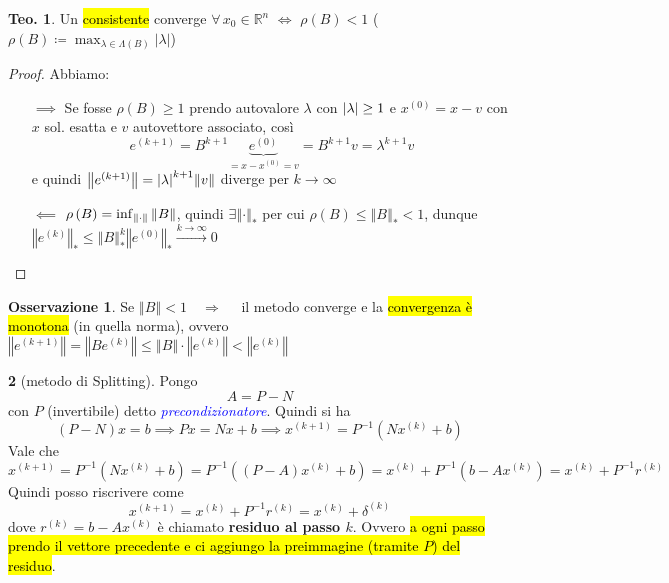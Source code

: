 \documentclass[a4paper,10pt]{article}
\theoremstyle{definition}
\theoremstyle{indentdefinition}
\theoremstyle{indenttheorem}
\newtheorem{thm}{Teo.}
\theoremstyle{myremark}
\newtheorem*{rem*}{Osservazione}
\theoremstyle{indentgeneral}
\newtheorem{lyxalgorithm}[thm]{\protect\algorithmname}
\theoremstyle{plain}
\theoremstyle{plain}
\newenvironment{myboxed} 
{\noindent\begin{lrbox}{\mybox}\begin{minipage}{\textwidth}}
{\end{minipage}\end{lrbox}\fbox{\usebox{\mybox}}}
\begin{document}
\begin{myboxed}
\begin{thm}
Un  \hl{consistente} converge
$\forall\,x_{0}\in\mathbb{R}^{n}$ $\Longleftrightarrow$ $\rho\left(B\right)<1$
($\rho\left(B\right)\coloneqq\max_{\lambda\in\Lambda\left(B\right)}\left|\lambda\right|$)
\end{thm}
\end{myboxed}

\begin{proof}
Abbiamo:
\begin{itemize}
    \item[$\implies$] Se fosse $\rho(B)\ge1$ prendo autovalore $\lambda$ con $\abs{\lambda}\ge 1$ e $x^{(0)}=x-v$ con $x$ sol. esatta e $v$ autovettore associato, così
    $$e^{(k+1)}=B^{k+1}\underbrace{e^{(0)}}_{=x-x^{(0)}=v}=B^{k+1}v=\lambda^{k+1}v$$
    e quindi $\norm{e^{(k+1)}}=\abs{\lambda}^{k+1}\norm{v}$ diverge per $k\to\infty$
    \item[$\impliedby$] $\rho\left(B\right)=\inf_{ \norm{\cdot}}\left\Vert B\right\Vert $,
quindi $\exists\left\Vert \cdot\right\Vert _{*}$ per cui $\rho\left(B\right)\leq\left\Vert B\right\Vert _{*}<1$,
dunque $\left\Vert e^{\left(k\right)}\right\Vert _{*}\leq\left\Vert B\right\Vert^k_{*}\left\Vert e^{\left(0\right)}\right\Vert _{*}\overset{k\to\infty}{\to}0$
\end{itemize}

\end{proof}
\begin{rem*}
Se $\left\Vert B\right\Vert <1\quad\Longrightarrow\quad$ 
il metodo converge e la \hl{convergenza è monotona} (in quella norma), ovvero $\left\Vert e^{\left(k+1\right)}\right\Vert =\left\Vert Be^{\left(k\right)}\right\Vert \leq\left\Vert B\right\Vert \cdot\left\Vert e^{\left(k\right)}\right\Vert <\left\Vert e^{\left(k\right)}\right\Vert $
\end{rem*}
\begin{lyxalgorithm}[metodo di Splitting]
\label{def:metodo-di-splitting}Pongo 
$$A=P-N$$  
con $P$ (invertibile) detto \textcolor{blue}{\textit{precondizionatore}}. Quindi si ha 
$$(P-N)x=b\implies Px=Nx+b \implies x^{\left(k+1\right)}=P^{-1}\left(Nx^{\left(k\right)}+b\right)$$
Vale che
\[
x^{\left(k+1\right)}=P^{-1}\left(Nx^{\left(k\right)}+b\right)=P^{-1}\left(\left(P-A\right)x^{\left(k\right)}+b\right)=x^{\left(k\right)}+P^{-1}\left(b-Ax^{\left(k\right)}\right)=x^{\left(k\right)}+P^{-1}r^{\left(k\right)}
\]
Quindi posso riscrivere come
$$\boxed{x^{\left(k+1\right)}=x^{\left(k\right)}+P^{-1}r^{\left(k\right)}=x^{\left(k\right)}+\delta^{(k)}}$$
dove $\boxed{r^{(k)}=b-Ax^{(k)}}$ è chiamato \textbf{residuo al passo $k$}. Ovvero \hl{a ogni passo prendo il vettore precedente e ci aggiungo la preimmagine (tramite $P$) del residuo}.
\end{lyxalgorithm}
\end{document}
